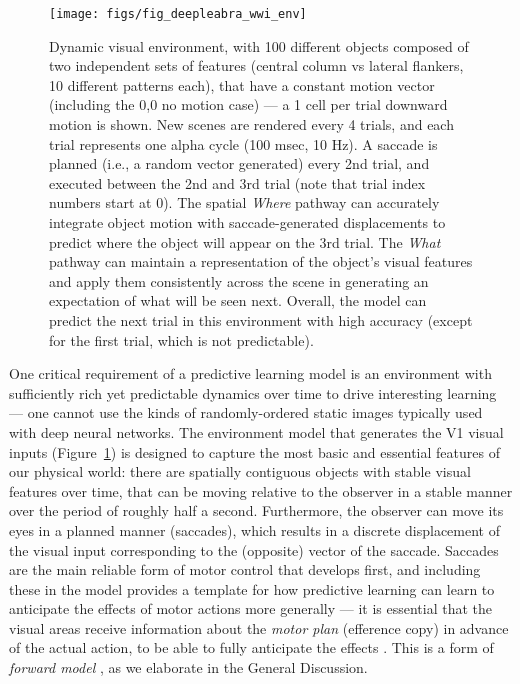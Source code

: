 \documentclass[11pt,twoside]{article}
\newif\myifpdf
\begin{document}
\begin{figure}
  \centering\texttt{[image: figs/fig\_deepleabra\_wwi\_env]}
  \caption{\footnotesize Dynamic visual environment, with 100 different objects composed of two independent sets of features (central column vs lateral flankers, 10 different patterns each), that have a constant motion vector (including the 0,0 no motion case) --- a 1 cell per trial downward motion is shown.  New scenes are rendered every 4 trials, and each trial represents one alpha cycle (100 msec, 10 Hz). A saccade is planned (i.e., a random vector generated) every 2nd trial, and executed between the 2nd and 3rd trial (note that trial index numbers start at 0).  The spatial {\em Where} pathway can accurately integrate object motion with saccade-generated displacements to predict where the object will appear on the 3rd trial.  The {\em What} pathway can maintain a representation of the object's visual features and apply them consistently across the scene in generating an expectation of what will be seen next.  Overall, the model can predict the next trial in this environment with high accuracy (except for the first trial, which is not predictable).}
  \label{fig.wwi_env}
\end{figure}

One critical requirement of a predictive learning model is an environment with sufficiently rich yet predictable dynamics over time to drive interesting learning --- one cannot use the kinds of randomly-ordered static images typically used with deep neural networks. The environment model that generates the V1 visual inputs (Figure~\ref{fig.wwi_env}) is designed to capture the most basic and essential features of our physical world: there are spatially contiguous objects with stable visual features over time, that can be moving relative to the observer in a stable manner over the period of roughly half a second.  Furthermore, the observer can move its eyes in a planned manner (saccades), which results in a discrete displacement of the visual input corresponding to the (opposite) vector of the saccade.  Saccades are the main reliable form of motor control that develops first, and including these in the model provides a template for how predictive learning can learn to anticipate the effects of motor actions more generally --- it is essential that the visual areas receive information about the {\em motor plan} (efference copy) in advance of the actual action, to be able to fully anticipate the effects \cite{vonHolst54,Wurtz08}.  This is a form of {\em forward model} \cite{KawatoFurukawaSuzuki87,JordanRumelhart92,MiallWolpert96}, as we elaborate in the General Discussion.
\end{document}
